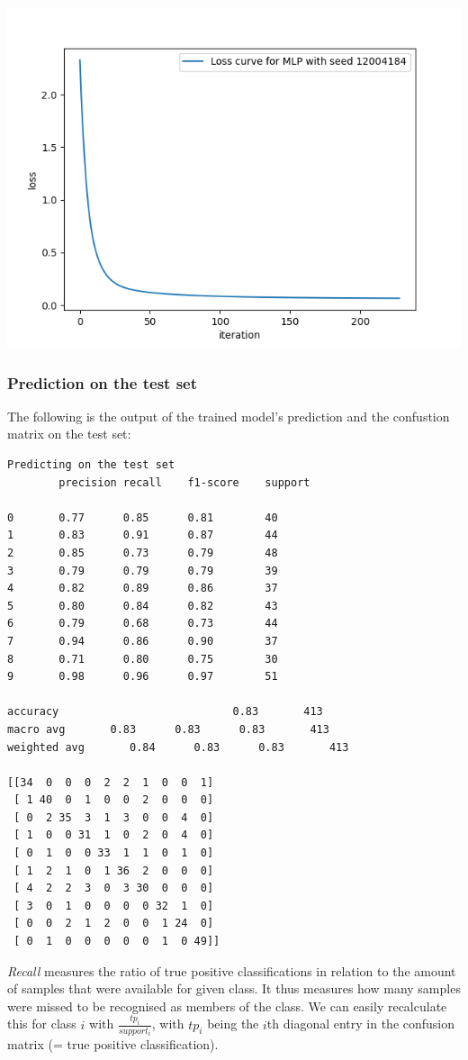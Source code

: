     \includegraphics[width=\textwidth]{code/plots/losscurve}

    \pagebreak
    \subsubsection{Prediction on the test set}
    The following is the output of the trained model's prediction and the confustion matrix on the test set:

    \begin{lstlisting}
Predicting on the test set
        precision recall    f1-score    support

0       0.77      0.85      0.81        40
1       0.83      0.91      0.87        44
2       0.85      0.73      0.79        48
3       0.79      0.79      0.79        39
4       0.82      0.89      0.86        37
5       0.80      0.84      0.82        43
6       0.79      0.68      0.73        44
7       0.94      0.86      0.90        37
8       0.71      0.80      0.75        30
9       0.98      0.96      0.97        51

accuracy                           0.83       413
macro avg       0.83      0.83      0.83       413
weighted avg       0.84      0.83      0.83       413

[[34  0  0  0  2  2  1  0  0  1]
 [ 1 40  0  1  0  0  2  0  0  0]
 [ 0  2 35  3  1  3  0  0  4  0]
 [ 1  0  0 31  1  0  2  0  4  0]
 [ 0  1  0  0 33  1  1  0  1  0]
 [ 1  2  1  0  1 36  2  0  0  0]
 [ 4  2  2  3  0  3 30  0  0  0]
 [ 3  0  1  0  0  0  0 32  1  0]
 [ 0  0  2  1  2  0  0  1 24  0]
 [ 0  1  0  0  0  0  0  1  0 49]]

    \end{lstlisting}
    \textit{Recall} measures the ratio of true positive classifications in relation to the amount of samples that were available for given class.
    It thus measures how many samples were missed to be recognised as members of the class.
    We can easily recalculate this for class $i$ with $\frac{tp_i}{support_i}$, with $tp_i$ being the $i$th diagonal entry in the confusion matrix (= true positive classification).

